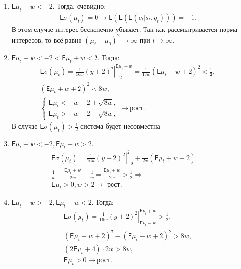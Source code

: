 \documentclass[12pt, twoside]{article}
\begin{document}
\begin{enumerate}
  \item $\mathsf{E} \mu_t + w < -2$. Тогда, очевидно:
    \begin{gather*}
      \mathsf{E}\sigma(\mu_t) = 0 \to \mathsf{E}(\mathsf{E}(\mathsf{E}(c_t|s_t, q_t))) = -1.
    \end{gather*}
    В этом случае интерес бесконечно убывает. 
    Так как рассмытривается норма интересов, то всё равно $(\mu_t -\mu_0)^2 \to \infty$ при $t\to\infty$. 

  \item $\mathsf{E}\mu_t - w < -2 < \mathsf{E}\mu_t + w < 2$. Тогда:
    \begin{gather*}
      \mathsf{E}\sigma(\mu_t) = \left. \frac{1}{16w} (y+2)^2 \right|_{-2}^{\mathsf{E}\mu_t + w} = 
        \frac{1}{16w} (\mathsf{E}\mu_t + w + 2)^2 < \frac{1}{2}, \\
        (\mathsf{E}\mu_t + w + 2)^2 < 8w, \\
    \begin{cases}
      \mathsf{E}\mu_t < -w - 2 + \sqrt{8w}, \\
      \mathsf{E}\mu_t > -w - 2 - \sqrt{8w}, 
    \end{cases} \to \text{рост}.
    \end{gather*}
    В случае $\mathsf{E}\sigma(\mu_t) > \frac{1}{2}$ система будет несовместна. 

  \item $\mathsf{E}\mu_t - w < -2, \mathsf{E}\mu_t + w > 2$. 
    \begin{gather*}
      \mathsf{E}\sigma(\mu_t) = \left. \frac{1}{16 w} (y+2)^2 \right|_{-2}^{2} + \frac{1}{2 w}(\mathsf{E}\mu_t + w -2) = \\
        \frac{1}{w} + \frac{\mathsf{E}\mu_t+w}{2w} - \frac{1}{w} = \frac{\mathsf{E}\mu_t + w}{2 w} > \frac{1}{2} \Rightarrow \\
        \mathsf{E}\mu_t > 0, w > 2 \to \text{ рост}.
    \end{gather*}
  
  \item $\mathsf{E}\mu_t - w > -2, \mathsf{E}\mu_t + w < 2$. Тогда:
    \begin{gather*}
      \mathsf{E}\sigma(\mu_t) = \left. \frac{1}{16 w} (y+2)^2 \right|_{\mathsf{E}\mu_t - w}^{\mathsf{E}\mu_t + w} > \frac{1}{2},\\
        (\mathsf{E}\mu_t + w + 2)^2 - (\mathsf{E}\mu_t - w + 2)^2 > 8w,\\
        (2 \mathsf{E}\mu_t + 4) \cdot 2w > 8w,\\
        \mathsf{E} \mu_t  > 0 \to \text{рост}. 
    \end{gather*}
  

\end{enumerate}
\end{document}
